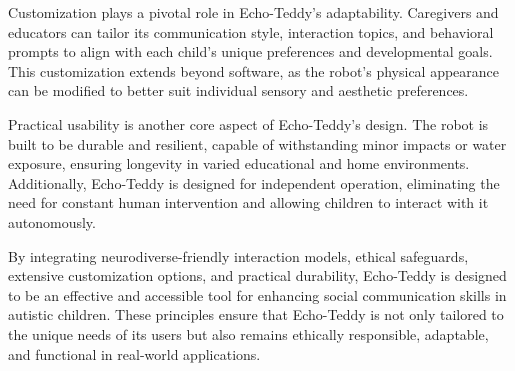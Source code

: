 Customization plays a pivotal role in Echo-Teddy’s adaptability. Caregivers and educators can tailor its communication style, interaction topics, and behavioral prompts to align with each child’s unique preferences and developmental goals. This customization extends beyond software, as the robot’s physical appearance can be modified to better suit individual sensory and aesthetic preferences.

Practical usability is another core aspect of Echo-Teddy’s design. The robot is built to be durable and resilient, capable of withstanding minor impacts or water exposure, ensuring longevity in varied educational and home environments. Additionally, Echo-Teddy is designed for independent operation, eliminating the need for constant human intervention and allowing children to interact with it autonomously.

By integrating neurodiverse-friendly interaction models, ethical safeguards, extensive customization options, and practical durability, Echo-Teddy is designed to be an effective and accessible tool for enhancing social communication skills in autistic children. These principles ensure that Echo-Teddy is not only tailored to the unique needs of its users but also remains ethically responsible, adaptable, and functional in real-world applications.

